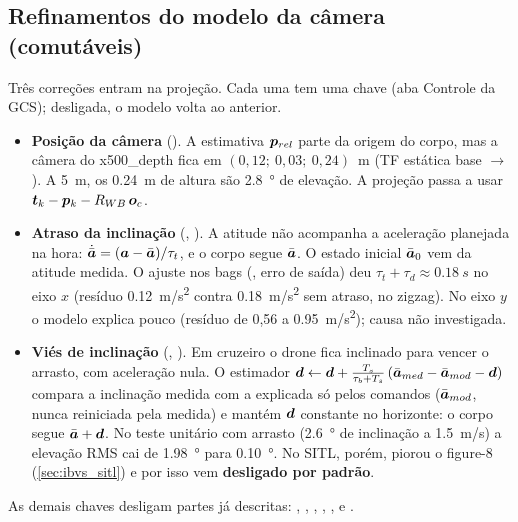 \subsection{Refinamentos do modelo da câmera (comutáveis)}
\label{sec:ibvs_refinamentos}
Três correções entram na projeção. Cada uma tem uma chave  (aba Controle da
GCS); desligada, o modelo volta ao anterior.
\begin{itemize}
  \item \textbf{Posição da câmera} (). A estimativa $\bm{p}_{rel}$ parte da
        origem do corpo, mas a câmera do x500\_depth fica em $(0{,}12;\ 0{,}03;\ 0{,}24)$~m (TF estática
        base $\to$ ). A \SI{5}{m}, os \SI{0,24}{m} de altura são \SI{2,8}{\degree} de
        elevação. A projeção passa a usar $\bm{t}_k-\bm{p}_k-R_{WB}\,\bm{o}_c$.
  \item \textbf{Atraso da inclinação} (, ). A atitude
        não acompanha a aceleração planejada na hora: $\dot{\bar{\bm{a}}}=(\bm{a}-\bar{\bm{a}})/\tau_t$,
        e o corpo segue $\bar{\bm{a}}$. O estado inicial $\bar{\bm{a}}_0$ vem da atitude medida. O ajuste
        nos bags (, erro de saída) deu $\tau_t+\tau_d\approx\SI{0,18}{s}$
        no eixo $x$ (resíduo \SI{0,12}{m/s^2} contra \SI{0,18}{m/s^2} sem atraso, no zigzag). No eixo
        $y$ o modelo explica pouco (resíduo de 0,56 a \SI{0,95}{m/s^2}); causa não investigada.
  \item \textbf{Viés de inclinação} (, ). Em cruzeiro o
        drone fica inclinado para vencer o arrasto, com aceleração nula. O estimador
        $\bm{d}\leftarrow\bm{d}+\tfrac{T_s}{\tau_b+T_s}\,(\bar{\bm{a}}_{med}-\bar{\bm{a}}_{mod}-\bm{d})$
        compara a inclinação medida com a explicada só pelos comandos ($\bar{\bm{a}}_{mod}$, nunca
        reiniciada pela medida) e mantém $\bm{d}$ constante no horizonte: o corpo segue
        $\bar{\bm{a}}+\bm{d}$. No teste unitário com arrasto (\SI{2,6}{\degree} de inclinação a
        \SI{1,5}{m/s}) a elevação RMS cai de \SI{1,98}{\degree} para \SI{0,10}{\degree}. No SITL, porém,
        piorou o figure-8 (\autoref{sec:ibvs_sitl}) e por isso vem \textbf{desligado por padrão}.
\end{itemize}
As demais chaves desligam partes já descritas: , ,
, , ,  e
.

